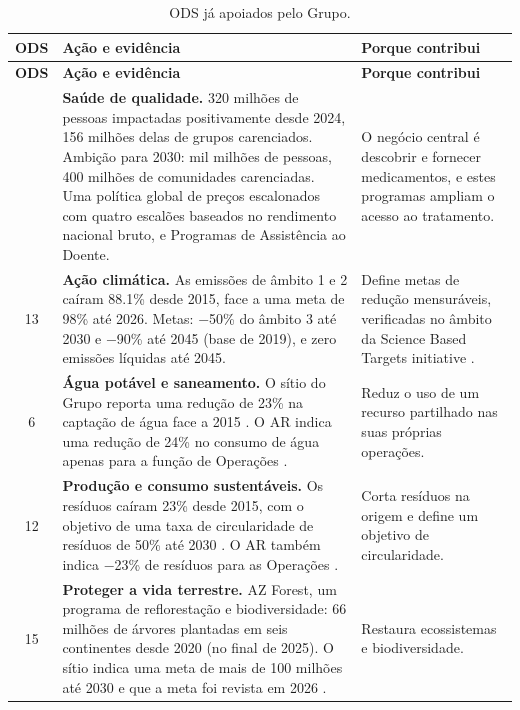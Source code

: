 \begin{xltabular}{\linewidth}{@{}c>{\hsize}Y>{\hsize}Y@{}}
\caption{ODS já apoiados pelo Grupo.}\label{tab:ods-atuais}\\*
\toprule
\textbf{ODS} & \textbf{Ação e evidência} & \textbf{Porque contribui} \\*
\midrule
\endfirsthead
\toprule
\textbf{ODS} & \textbf{Ação e evidência} & \textbf{Porque contribui} \\*
\midrule
\endhead
\bottomrule
{} & \textbf{Saúde de qualidade.} 320 milhões de pessoas impactadas positivamente desde 2024, 156 milhões delas de grupos carenciados. Ambição para 2030: mil milhões de pessoas, 400 milhões de comunidades carenciadas. Uma política global de preços escalonados com quatro escalões baseados no rendimento nacional bruto, e Programas de Assistência ao Doente. \cite[pp.~5, 41]{AR} & O negócio central é descobrir e fornecer medicamentos, e estes programas ampliam o acesso ao tratamento. \\
13 & \textbf{Ação climática.} As emissões de âmbito 1 e 2 caíram 88.1\% desde 2015, face a uma meta de 98\% até 2026. Metas: $-$50\% do âmbito 3 até 2030 e $-$90\% até 2045 (base de 2019), e zero emissões líquidas até 2045. \cite[pp.~2, 42]{AR} & Define metas de redução mensuráveis, verificadas no âmbito da Science Based Targets initiative \cite[p.~42]{AR}. \\
6 & \textbf{Água potável e saneamento.} O sítio do Grupo reporta uma redução de 23\% na captação de água face a 2015 \cite{NATURE}. O AR indica uma redução de 24\% no consumo de água apenas para a função de Operações \cite[p.~33]{AR}. & Reduz o uso de um recurso partilhado nas suas próprias operações. \\
12 & \textbf{Produção e consumo sustentáveis.} Os resíduos caíram 23\% desde 2015, com o objetivo de uma taxa de circularidade de resíduos de 50\% até 2030 \cite{NATURE}. O AR também indica $-$23\% de resíduos para as Operações \cite[p.~33]{AR}. & Corta resíduos na origem e define um objetivo de circularidade. \\
15 & \textbf{Proteger a vida terrestre.} AZ Forest, um programa de reflorestação e biodiversidade: 66 milhões de árvores plantadas em seis continentes desde 2020 (no final de 2025). O sítio indica uma meta de mais de 100 milhões até 2030 e que a meta foi revista em 2026 \cite{FOREST}. & Restaura ecossistemas e biodiversidade. \\
\end{xltabular}

